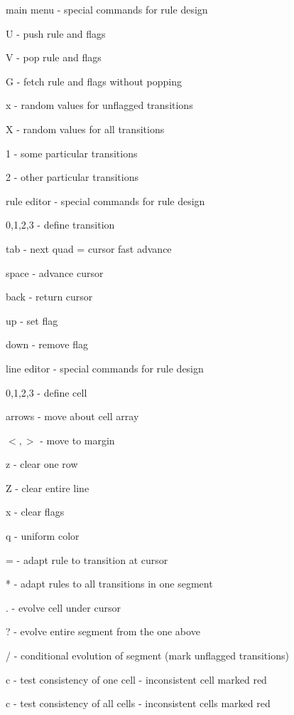 \begin{list}{}{}
\item[main menu] - special commands for rule design 

\begin{list}{}{}
\item[U] - push rule and flags 
\item[V] - pop rule and flags 
\item[G] - fetch rule and flags without popping 
\item[x] - random values for unflagged transitions 
\item[X] - random values for all transitions 
\item[1] - some particular transitions
\item[2] - other particular transitions
\end{list} 

\item[rule editor] - special commands for rule design 

\begin{list}{}{}
\item[0,1,2,3] - define transition 
\item[tab] - next quad = cursor fast advance
\item[space] - advance cursor 
\item[back] - return cursor 
\item[up] - set flag 
\item[down] - remove flag 
\end{list} 

\item[line editor] - special commands for rule design 

\begin{list}{}{}
\item[0,1,2,3] - define cell 
\item[arrows] - move about cell array
\item[$<,>$] - move to margin 
\item[z] - clear one row 
\item[Z] - clear entire line 
\item[x] - clear flags 
\item[q] - uniform color 
\item[=] - adapt rule to transition at cursor 
\item[*] - adapt rules to all transitions in one segment 
\item[.] - evolve cell under cursor 
\item[?] - evolve entire segment from the one above 
\item[/] - conditional evolution of segment (mark unflagged transitions) 
\item[c] - test consistency of one cell - inconsistent cell marked red 
\item[c] - test consistency of all cells - inconsistent cells marked red 
\end{list} 

\end{list} 

